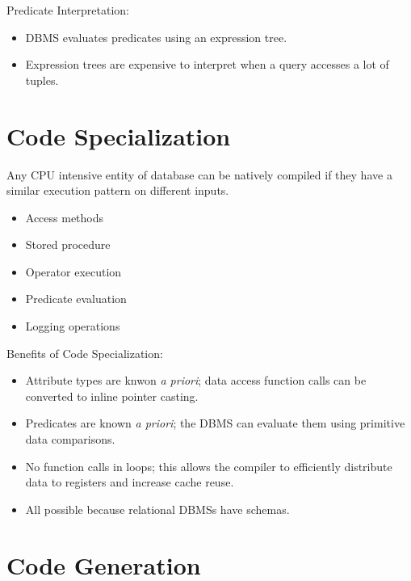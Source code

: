 \documentclass[11pt]{article}
\begin{document}
Predicate Interpretation:
\begin{itemize}
    \item
    DBMS evaluates predicates using an expression tree.
    
    \item
    Expression trees are expensive to interpret when a query accesses a lot of tuples.
\end{itemize}

\section{Code Specialization}
Any CPU intensive entity of database can be natively compiled if they have a similar 
execution pattern on different inputs.
\begin{itemize}
    \item Access methods
    \item Stored procedure
    \item Operator execution
    \item Predicate evaluation
    \item Logging operations
\end{itemize}
    
Benefits of Code Specialization:
\begin{itemize}
    \item
    Attribute types are knwon \textit{a priori}; data access function calls can be converted to 
    inline pointer casting.
    
    \item
    Predicates are known \textit{a priori}; the DBMS can evaluate them using primitive 
    data comparisons.
    
    \item
    No function calls in loops; this allows the compiler to efficiently distribute data to 
    registers and increase cache reuse.
    
    \item
    All possible because relational DBMSs have schemas.
\end{itemize}

\section{Code Generation}
\end{document}
